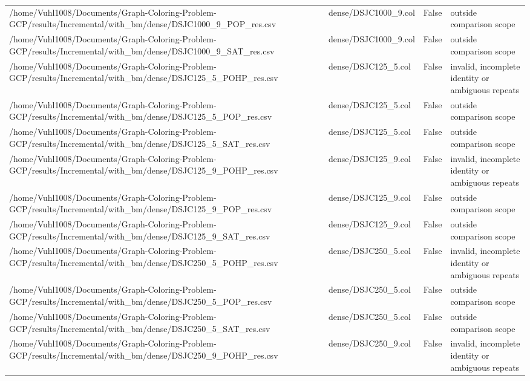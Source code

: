 \begin{table}[htbp]
\begin{tabular}{llll}
/home/Vuhl1008/Documents/Graph-Coloring-Problem-GCP/results/Incremental/with\_bm/dense/DSJC1000\_9\_POP\_res.csv & dense/DSJC1000\_9.col & False & outside comparison scope \\
/home/Vuhl1008/Documents/Graph-Coloring-Problem-GCP/results/Incremental/with\_bm/dense/DSJC1000\_9\_SAT\_res.csv & dense/DSJC1000\_9.col & False & outside comparison scope \\
/home/Vuhl1008/Documents/Graph-Coloring-Problem-GCP/results/Incremental/with\_bm/dense/DSJC125\_5\_POHP\_res.csv & dense/DSJC125\_5.col & False & invalid, incomplete identity or ambiguous repeats \\
/home/Vuhl1008/Documents/Graph-Coloring-Problem-GCP/results/Incremental/with\_bm/dense/DSJC125\_5\_POP\_res.csv & dense/DSJC125\_5.col & False & outside comparison scope \\
/home/Vuhl1008/Documents/Graph-Coloring-Problem-GCP/results/Incremental/with\_bm/dense/DSJC125\_5\_SAT\_res.csv & dense/DSJC125\_5.col & False & outside comparison scope \\
/home/Vuhl1008/Documents/Graph-Coloring-Problem-GCP/results/Incremental/with\_bm/dense/DSJC125\_9\_POHP\_res.csv & dense/DSJC125\_9.col & False & invalid, incomplete identity or ambiguous repeats \\
/home/Vuhl1008/Documents/Graph-Coloring-Problem-GCP/results/Incremental/with\_bm/dense/DSJC125\_9\_POP\_res.csv & dense/DSJC125\_9.col & False & outside comparison scope \\
/home/Vuhl1008/Documents/Graph-Coloring-Problem-GCP/results/Incremental/with\_bm/dense/DSJC125\_9\_SAT\_res.csv & dense/DSJC125\_9.col & False & outside comparison scope \\
/home/Vuhl1008/Documents/Graph-Coloring-Problem-GCP/results/Incremental/with\_bm/dense/DSJC250\_5\_POHP\_res.csv & dense/DSJC250\_5.col & False & invalid, incomplete identity or ambiguous repeats \\
/home/Vuhl1008/Documents/Graph-Coloring-Problem-GCP/results/Incremental/with\_bm/dense/DSJC250\_5\_POP\_res.csv & dense/DSJC250\_5.col & False & outside comparison scope \\
/home/Vuhl1008/Documents/Graph-Coloring-Problem-GCP/results/Incremental/with\_bm/dense/DSJC250\_5\_SAT\_res.csv & dense/DSJC250\_5.col & False & outside comparison scope \\
/home/Vuhl1008/Documents/Graph-Coloring-Problem-GCP/results/Incremental/with\_bm/dense/DSJC250\_9\_POHP\_res.csv & dense/DSJC250\_9.col & False & invalid, incomplete identity or ambiguous repeats \\

\end{tabular}
\end{table}
